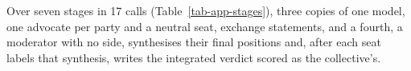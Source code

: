 Over seven stages in 17 calls (Table~\ref{tab-app-stages}), three
copies of one model, one advocate per party and a neutral seat, exchange
statements, and a fourth, a moderator with no side, synthesises their final
positions and, after each seat labels that synthesis, writes the integrated
verdict scored as the collective's.
